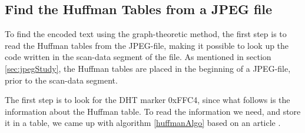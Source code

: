 \subsection{Find the Huffman Tables from a JPEG file}
\label{sec:DesignHuffman}
To find the encoded text using the graph-theoretic method, the first step is to read the Huffman tables from the JPEG-file, making it possible to look up the code written in the scan-data segment of the file.
As mentioned in section \ref{sec:jpegStudy}, the Huffman tables are placed in the beginning of a JPEG-file, prior to the scan-data segment.

The first step is to look for the DHT marker 0xFFC4, since what follows is the information about the Huffman table.
To read the information we need, and store it in a table, we came up with algorithm \ref{huffmanAlgo} based on an article \citep{HuffmanDecoding}.

